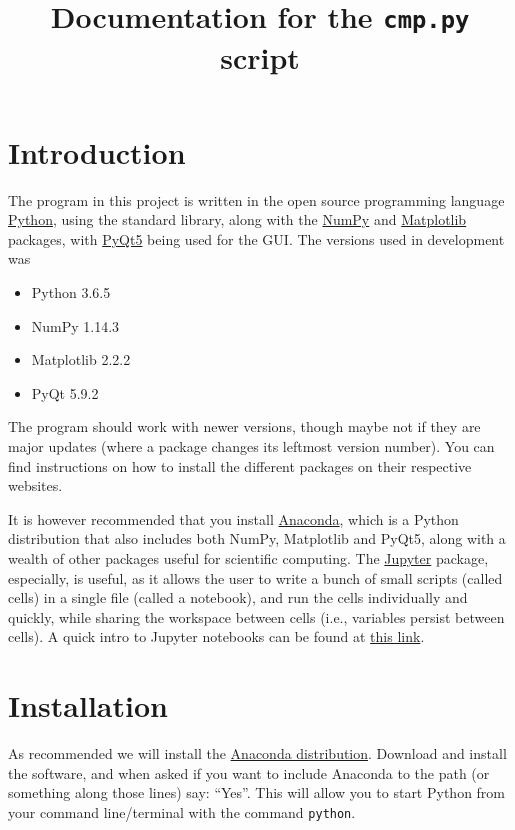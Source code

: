 \documentclass[a4paper,11pt]{article}
\title{Documentation for the \texorpdfstring{\texttt{cmp.py}}{cmp.py} script}
\date{}
\numberwithin{equation}{section}
\begin{document}
	\maketitle
	
	\section{Introduction}
	The program in this project is written in the open source programming language \href{www.python.org}{Python}, using the standard library, along with the \href{www.numpy.org}{NumPy} and \href{www.matplotlib.org}{Matplotlib} packages, with \href{www.pypi.org/project/PyQt5/}{PyQt5} being used for the GUI. The versions used in development was
	\begin{itemize}
		\item Python 3.6.5
		\item NumPy 1.14.3
		\item Matplotlib 2.2.2
		\item PyQt 5.9.2
	\end{itemize}
	The program should work with newer versions, though maybe not if they are major updates (where a package changes its leftmost version number). You can find instructions on how to install the different packages on their respective websites.
	
	It is however recommended that you install \href{https://www.anaconda.com/}{Anaconda}, which is a Python distribution that also includes both NumPy, Matplotlib and PyQt5, along with a wealth of other packages useful for scientific computing. The \href{http://jupyter.org/}{Jupyter} package, especially, is useful, as it allows the user to write a bunch of small scripts (called cells) in a single file (called a notebook), and run the cells individually and quickly, while sharing the workspace between cells (i.e., variables persist between cells). A quick intro to Jupyter notebooks can be found at \href{http://nbviewer.jupyter.org/github/jupyter/notebook/blob/master/docs/source/examples/Notebook/Notebook Basics.ipynb}{this link}.
	
	\section{Installation}
	As recommended we will install the \href{https://www.anaconda.com/download/}{Anaconda distribution}. Download and install the software, and when asked if you want to include Anaconda to the path (or something along those lines) say: ``Yes''. This will allow you to start Python from your command line/terminal with the command \texttt{python}.
	
\end{document}
